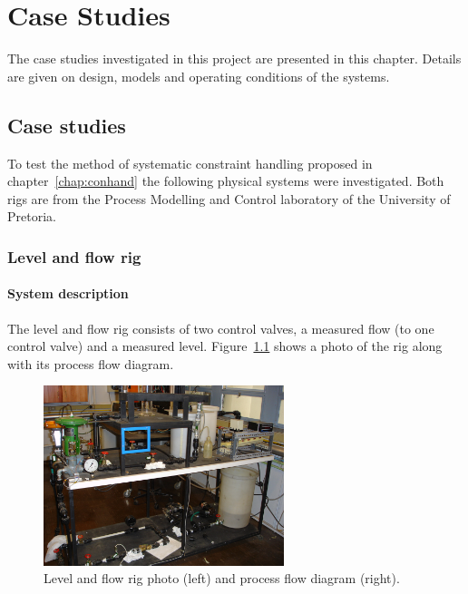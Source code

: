 \chapter{Case Studies}\label{chap:casestudies}
\begin{overview}
  The case studies investigated in this project are presented in this chapter.
  Details are given on design, models and operating conditions of the systems. 
\end{overview}

\section{Case studies}
To test the method of systematic constraint handling proposed in chapter~\ref{chap:conhand} the following physical systems were investigated.
Both rigs are from the Process Modelling and Control laboratory of the University of Pretoria.

\subsection{Level and flow rig}
\subsubsection{System description}
The level and flow rig consists of two control valves, a measured flow (to one control valve) and a measured level.
Figure~\ref{fig:flowphoto} shows a photo of the rig along with its process flow diagram.
\begin{figure}[htbp]
  \centering
    \includegraphics[width=7.0cm]{graph/flowphoto.JPG}
    \scalebox{1}{}  
  \caption[Level and flow rig photo and flow diagram]{Level and flow rig photo (left) and process flow diagram (right).}
  \label{fig:flowphoto}
\end{figure}

